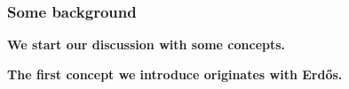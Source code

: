\documentclass{beamer}
\begin{document}
\begin{frame}
\frametitle{Some background}

\textbf<1>{We start our discussion with some concepts.}

\textbf<2>{The first concept we introduce originates with Erd\H os.}
\end{frame}
\end{document}
